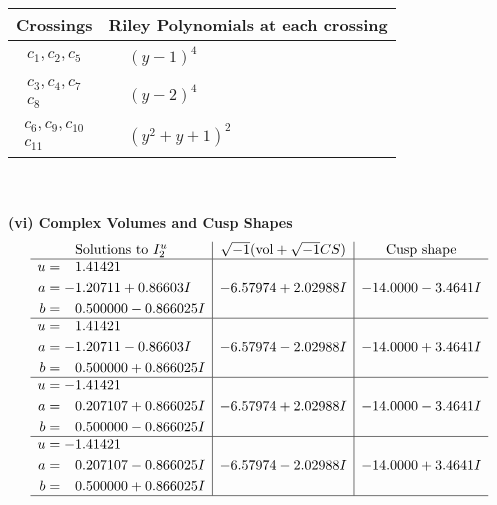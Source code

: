 \documentclass[1p]{elsarticle_modified}
\theoremstyle{definition}
\newcommand{\I}{\sqrt{-1}}
\begin{document}
\begin{tabular}{m{50pt}|m{274pt}}
Crossings & \hspace{64pt}Riley Polynomials at each crossing \\
\hline $$\begin{aligned}c_{1},c_{2},c_{5}\end{aligned}$$&$\begin{aligned}
&(y-1)^4
\end{aligned}$\\
\hline $$\begin{aligned}c_{3},c_{4},c_{7}\\c_{8}\end{aligned}$$&$\begin{aligned}
&(y-2)^4
\end{aligned}$\\
\hline $$\begin{aligned}c_{6},c_{9},c_{10}\\c_{11}\end{aligned}$$&$\begin{aligned}
&(y^2+y+1)^2
\end{aligned}$\\
\hline
\end{tabular}\\~\\
\newpage\flushleft \textbf{(vi) Complex Volumes and Cusp Shapes}
$$\begin{array}{c|c|c}  
\text{Solutions to }I^u_{2}& \I (\text{vol} + \sqrt{-1}CS) & \text{Cusp shape}\\
 \hline 
\begin{aligned}
u &= \phantom{-}1.41421\phantom{ +0.000000I} \\
a &= -1.20711 + 0.86603 I \\
b &= \phantom{-}0.500000 - 0.866025 I\end{aligned}
 & -6.57974 + 2.02988 I & -14.0000 - 3.4641 I \\ \hline\begin{aligned}
u &= \phantom{-}1.41421\phantom{ +0.000000I} \\
a &= -1.20711 - 0.86603 I \\
b &= \phantom{-}0.500000 + 0.866025 I\end{aligned}
 & -6.57974 - 2.02988 I & -14.0000 + 3.4641 I \\ \hline\begin{aligned}
u &= -1.41421\phantom{ +0.000000I} \\
a &= \phantom{-}0.207107 + 0.866025 I \\
b &= \phantom{-}0.500000 - 0.866025 I\end{aligned}
 & -6.57974 + 2.02988 I & -14.0000 - 3.4641 I \\ \hline\begin{aligned}
u &= -1.41421\phantom{ +0.000000I} \\
a &= \phantom{-}0.207107 - 0.866025 I \\
b &= \phantom{-}0.500000 + 0.866025 I\end{aligned}
 & -6.57974 - 2.02988 I & -14.0000 + 3.4641 I\\
 \hline 
 \end{array}$$\newpage\newpage\renewcommand{\arraystretch}{1}
\end{document}
